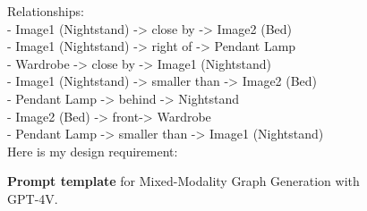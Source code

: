 \begin{figure*}[!t]
\begin{center}
\begin{tcolorbox} [top=2pt,bottom=2pt, width=\linewidth, boxrule=1pt]
{{    Relationships:   \\
    - Image1 (Nightstand) -> close by -> Image2 (Bed) \\
    - Image1 (Nightstand) -> right of -> Pendant Lamp  \\
    - Wardrobe -> close by -> Image1 (Nightstand)  \\
    - Image1 (Nightstand) -> smaller than -> Image2 (Bed)   \\
    - Pendant Lamp -> behind -> Nightstand   \\
    - Image2 (Bed) -> front-> Wardrobe     \\
    - Pendant Lamp -> smaller than -> Image1 (Nightstand)   \\
    
    Here is my design requirement:
}
    \par}
    \end{tcolorbox}

    \end{center}
    \caption{\textbf{Prompt template} for Mixed-Modality Graph Generation with GPT-4V.}
    \label{fig:prompt-gpt}
\end{figure*}
